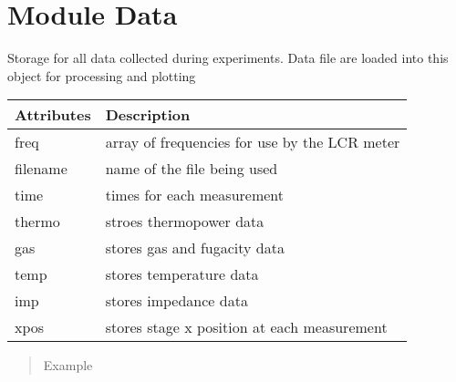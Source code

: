 \documentclass[letterpaper,10pt,english]{sphinxmanual}
\begin{document}
\chapter{Module Data}
\label{\detokenize{data:module-data}}\label{\detokenize{data:module-data}}\label{\detokenize{data::doc}}

\begin{fulllineitems}
\label{\detokenize{data:data.Data}}
Storage for all data collected during experiments. Data file are loaded into this object for processing and plotting


\begin{savenotes}\sphinxattablestart
\centering
\begin{tabulary}{\linewidth}[t]{|T|T|}
\hline
\sphinxstyletheadfamily 
Attributes
&\sphinxstyletheadfamily 
Description
\\
\hline
freq
&
array of frequencies for use by the LCR meter
\\
\hline
filename
&
name of the file being used
\\
\hline
time
&
times for each measurement
\\
\hline
thermo
&
stroes thermopower data
\\
\hline
gas
&
stores gas and fugacity data
\\
\hline
temp
&
stores temperature data
\\
\hline
imp
&
stores impedance data
\\
\hline
xpos
&
stores stage x position at each measurement
\\
\hline
\end{tabulary}
\par
\sphinxattableend\end{savenotes}
\begin{quote}\begin{description}
\item[{Example}] \leavevmode
\end{description}\end{quote}

%
\begin{sphinxVerbatim}[commandchars=\\\{\}]
  
\end{sphinxVerbatim}

\end{fulllineitems}
\end{document}
